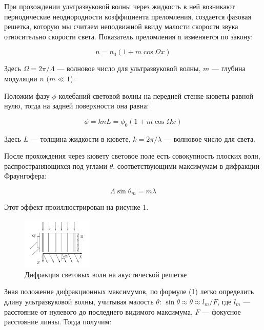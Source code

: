 \documentclass[12pt]{article}
\begin{document}
	При прохождении ультразвуковой волны через жидкость в ней возникают периодические неоднородности коэффициента преломления, создается фазовая решетка, которую мы считаем неподвижной ввиду малости скорости звука относительно скорости света. Показатель
	преломления n изменяется по закону:

	\begin{equation}\label{}
	n = n_0 (1 + m \cos \Omega x)
	\end{equation}

	Здесь $ \Omega = 2 \pi / \Lambda $ --- волновое число для ультразвуковой волны, $ m $ --- глубина модуляции $ n $ $ (m \ll 1 $).

	Положим фазу $ \phi $ колебаний световой волны на передней стенке кюветы равной нулю, тогда на задней поверхности она равна:

	\begin{equation}\label{}
	\phi  = k n L = \phi_0 (1 + m \cos \Omega x)
	\end{equation}

	Здесь $ L $ --- толщина жидкости в кювете, $ k = 2 \pi / \lambda $ --- волновое число для света.

	После прохождения через кювету световое поле есть совокупность плоских волн, распространяющихся под углами $ \theta $, соответствующими максимумам в дифракции Фраунгофера:

\begin{equation}\label{}
	\Lambda \sin \theta_m = m \lambda
\end{equation}

	Этот эффект проиллюстрирован на рисунке 1.
	\begin{figure}[h!]
		\centering
		\includegraphics[width=0.3\textwidth]{difraction.png}
		\caption{Дифракция световых волн на акустической решетке}
		\label{diff}
	\end{figure}

	Зная положение дифракционных максимумов, по формуле (1) легко определить длину ультразвуковой волны, учитывая малость $ \theta $: $ \sin \theta \approx \theta \approx l_m /F  $, где $ l_m $ --- расстояние от нулевого до последнего видимого максимума, $ F $ --- фокусное расстояние линзы. Тогда получим:
\end{document}
